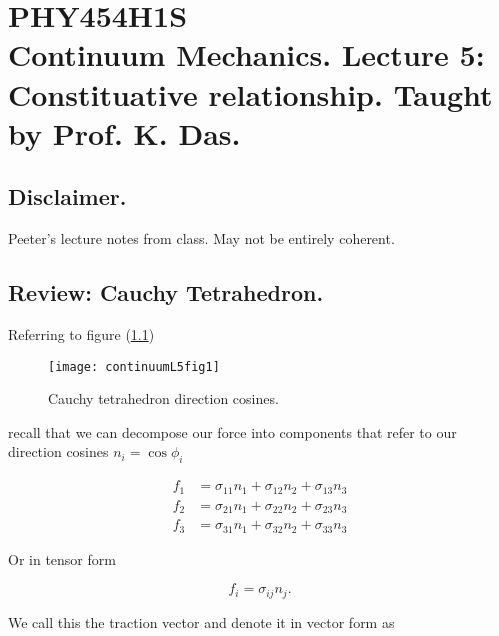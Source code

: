 
%

\chapter{PHY454H1S\\Continuum Mechanics.  Lecture 5: Constituative relationship.  Taught by Prof. K. Das.}
\label{chap:continuumL5}
{}
\date{Jan 25, 2012}

\beginArtWithToc

\section{Disclaimer.}

Peeter's lecture notes from class.  May not be entirely coherent.

\section{Review: Cauchy Tetrahedron.}

Referring to figure (\ref{fig:continuumL5:continuumL5fig1})
\begin{figure}[htp]
   \centering
   \texttt{[image: continuumL5fig1]}
   \caption{Cauchy tetrahedron direction cosines.}\label{fig:continuumL5:continuumL5fig1}
\end{figure}

recall that we can decompose our force into components that refer to our direction cosines $n_i = \cos\phi_i$

\begin{align}\label{eqn:continuumL5:10}
f_1 &= \sigma_{11} n_1 + \sigma_{12} n_2 + \sigma_{13} n_3 \\
f_2 &= \sigma_{21} n_1 + \sigma_{22} n_2 + \sigma_{23} n_3 \\
f_3 &= \sigma_{31} n_1 + \sigma_{32} n_2 + \sigma_{33} n_3
\end{align}

Or in tensor form

\begin{equation}\label{eqn:continuumL5:30}
f_i = \sigma_{ij} n_j.
\end{equation}

We call this the traction vector and denote it in vector form as

